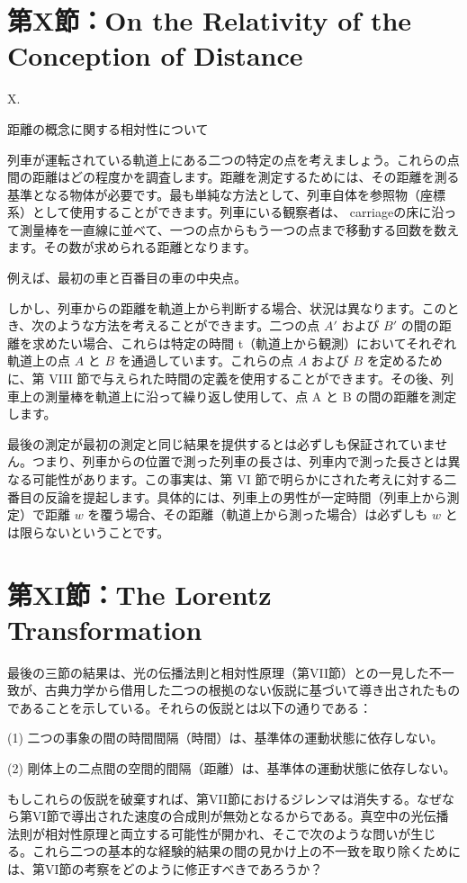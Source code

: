 \documentclass[a4paper,11pt,openany]{ltjsbook}
\begin{document}
\clearpage
\chapter{第X節：On the Relativity of the Conception of Distance}

X.

距離の概念に関する相対性について

列車が運転されている軌道上にある二つの特定の点を考えましょう。これらの点間の距離はどの程度かを調査します。距離を測定するためには、その距離を測る基準となる物体が必要です。最も単純な方法として、列車自体を参照物（座標系）として使用することができます。列車にいる観察者は、 carriageの床に沿って測量棒を一直線に並べて、一つの点からもう一つの点まで移動する回数を数えます。その数が求められる距離となります。

 例えば、最初の車と百番目の車の中央点。

しかし、列車からの距離を軌道上から判断する場合、状況は異なります。このとき、次のような方法を考えることができます。二つの点 $A′$ および $B′$ の間の距離を求めたい場合、これらは特定の時間 t（軌道上から観測）においてそれぞれ軌道上の点 $A$ と $B$ を通過しています。これらの点 $A$ および $B$ を定めるために、第 VIII 節で与えられた時間の定義を使用することができます。その後、列車上の測量棒を軌道上に沿って繰り返し使用して、点 A と B の間の距離を測定します。

最後の測定が最初の測定と同じ結果を提供するとは必ずしも保証されていません。つまり、列車からの位置で測った列車の長さは、列車内で測った長さとは異なる可能性があります。この事実は、第 VI 節で明らかにされた考えに対する二番目の反論を提起します。具体的には、列車上の男性が一定時間（列車上から測定）で距離 $w$ を覆う場合、その距離（軌道上から測った場合）は必ずしも $w$ とは限らないということです。


\clearpage
\chapter{第XI節：The Lorentz Transformation}

最後の三節の結果は、光の伝播法則と相対性原理（第VII節）との一見した不一致が、古典力学から借用した二つの根拠のない仮説に基づいて導き出されたものであることを示している。それらの仮説とは以下の通りである：

(1) 二つの事象の間の時間間隔（時間）は、基準体の運動状態に依存しない。

(2) 剛体上の二点間の空間的間隔（距離）は、基準体の運動状態に依存しない。

もしこれらの仮説を破棄すれば、第VII節におけるジレンマは消失する。なぜなら第VI節で導出された速度の合成則が無効となるからである。真空中の光伝播法則が相対性原理と両立する可能性が開かれ、そこで次のような問いが生じる。これら二つの基本的な経験的結果の間の見かけ上の不一致を取り除くためには、第VI節の考察をどのように修正すべきであろうか？
\end{document}
